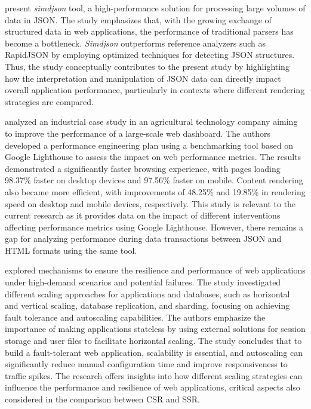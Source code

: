 \documentclass{sbc2019}%
\begin{document}
\citet{parsingJson:2019} present  \textit{simdjson} tool, a high-performance solution for processing large volumes of data in JSON. The study emphasizes that, with the growing exchange of structured data in web applications, the performance of traditional parsers has become a bottleneck. \textit{Simdjson} outperforms reference analyzers such as RapidJSON by employing optimized techniques for detecting JSON structures. Thus, the study conceptually contributes to the present study by highlighting how the interpretation and manipulation of JSON data can directly impact overall application performance, particularly in contexts where different rendering strategies are compared.

\citet{webPerformanceOptimize:2023} analyzed an industrial case study in an agricultural technology company aiming to improve the performance of a large-scale web dashboard. The authors developed a performance engineering plan using a benchmarking tool based on Google Lighthouse to assess the impact on web performance metrics. The results demonstrated a significantly faster browsing experience, with pages loading 98.37\% faster on desktop devices and 97.56\% faster on mobile. Content rendering also became more efficient, with improvements of 48.25\% and 19.85\% in rendering speed on desktop and mobile devices, respectively. This study is relevant to the current research as it provides data on the impact of different interventions affecting performance metrics using Google Lighthouse. However, there remains a gap for analyzing performance during data transactions between JSON and HTML formats using the same tool.

\citet{webAutoscaling:2022} explored mechanisms to ensure the resilience and performance of web applications under high-demand scenarios and potential failures. The study investigated different scaling approaches for applications and databases, such as horizontal and vertical scaling, database replication, and sharding, focusing on achieving fault tolerance and autoscaling capabilities. The authors emphasize the importance of making applications stateless by using external solutions for session storage and user files to facilitate horizontal scaling. The study concludes that to build a fault-tolerant web application, scalability is essential, and autoscaling can significantly reduce manual configuration time and improve responsiveness to traffic spikes. The research offers insights into how different scaling strategies can influence the performance and resilience of web applications, critical aspects also considered in the comparison between CSR and SSR.
\end{document}
